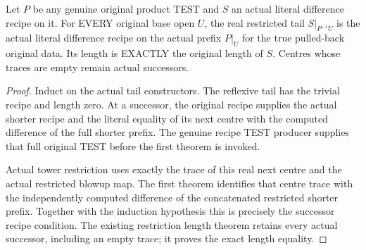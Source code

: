 \begin{theorem}
\label{hir:sharp-original-curve-actual-difference-recipe-open-restriction}
\leanok
Let $P$ be any genuine original product TEST and $S$ an actual literal
difference recipe on it. For EVERY original base open $U$, the real
restricted tail $S|_{P^{-1}U}$ is the actual literal difference recipe
on the actual prefix $P|_U$ for the true pulled-back original data.
Its length is EXACTLY the original length of $S$. Centres whose traces
are empty remain actual successors.
\end{theorem}
\begin{proof}
Induct on the actual tail constructors. The reflexive tail has the
trivial recipe and length zero. At a successor, the original recipe
supplies the actual shorter recipe and the literal equality of its
next centre with the computed difference of the full shorter prefix.
The genuine recipe TEST producer supplies that full original TEST
before the first theorem is invoked.

Actual tower restriction uses exactly the trace of this real next
centre and the actual restricted blowup map. The first theorem
identifies that centre trace with the independently computed difference
of the concatenated restricted shorter prefix. Together with the
induction hypothesis this is precisely the successor recipe condition.
The existing restriction length theorem retains every actual successor,
including an empty trace; it proves the exact length equality.
\end{proof}

